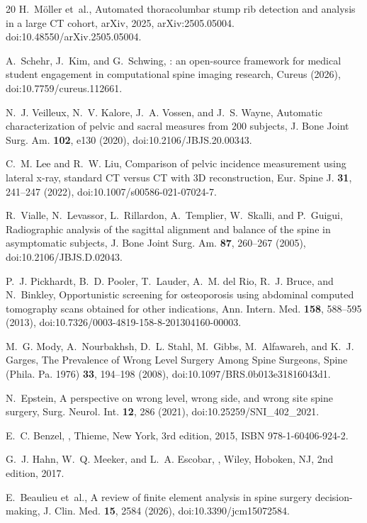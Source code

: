 \documentclass[aapm,mph,amsmath,amssymb,preprint,linenumbers]{revtex4-2}
\newif\ifcaptionlist \captionlisttrue
\begin{document}
\begin{thebibliography}{20}
H.~M{\"o}ller et~al.,
\newblock Automated thoracolumbar stump rib detection and analysis in a large {CT} cohort,
\newblock arXiv, 2025,
\newblock arXiv:2505.05004. doi:10.48550/arXiv.2505.05004.

A.~Schehr, J.~Kim, and G.~Schwing,
: an open-source framework for medical student engagement in computational spine imaging research,
\newblock Cureus  (2026),
\newblock doi:10.7759/cureus.112661.

N.~J. Veilleux, N.~V. Kalore, J.~A. Vossen, and J.~S. Wayne,
\newblock Automatic characterization of pelvic and sacral measures from 200 subjects,
\newblock J. Bone Joint Surg. Am. {\bf 102}, e130 (2020),
\newblock doi:10.2106/JBJS.20.00343.

C.~M. Lee and R.~W. Liu,
\newblock Comparison of pelvic incidence measurement using lateral x-ray, standard {CT} versus {CT} with {3D} reconstruction,
\newblock Eur. Spine J. {\bf 31}, 241--247 (2022),
\newblock doi:10.1007/s00586-021-07024-7.

R.~Vialle, N.~Levassor, L.~Rillardon, A.~Templier, W.~Skalli, and P.~Guigui,
\newblock Radiographic analysis of the sagittal alignment and balance of the spine in asymptomatic subjects,
\newblock J. Bone Joint Surg. Am. {\bf 87}, 260--267 (2005),
\newblock doi:10.2106/JBJS.D.02043.

P.~J. Pickhardt, B.~D. Pooler, T.~Lauder, A.~M. del Rio, R.~J. Bruce, and N.~Binkley,
\newblock Opportunistic screening for osteoporosis using abdominal computed tomography scans obtained for other indications,
\newblock Ann. Intern. Med. {\bf 158}, 588--595 (2013),
\newblock doi:10.7326/0003-4819-158-8-201304160-00003.

M.~G. Mody, A.~Nourbakhsh, D.~L. Stahl, M.~Gibbs, M.~Alfawareh, and K.~J. Garges,
\newblock The Prevalence of Wrong Level Surgery Among Spine Surgeons,
\newblock Spine (Phila. Pa. 1976) {\bf 33}, 194--198 (2008),
\newblock doi:10.1097/BRS.0b013e31816043d1.

N.~Epstein,
\newblock A perspective on wrong level, wrong side, and wrong site spine surgery,
\newblock Surg. Neurol. Int. {\bf 12}, 286 (2021),
\newblock doi:10.25259/SNI\_402\_2021.

E.~C. Benzel,
,
\newblock Thieme, New York, 3rd edition, 2015,
\newblock ISBN 978-1-60406-924-2.

G.~J. Hahn, W.~Q. Meeker, and L.~A. Escobar,
,
\newblock Wiley, Hoboken, NJ, 2nd edition, 2017.

E.~Beaulieu et~al.,
\newblock A review of finite element analysis in spine surgery decision-making,
\newblock J. Clin. Med. {\bf 15}, 2584 (2026),
\newblock doi:10.3390/jcm15072584.

\end{thebibliography}


\ifcaptionlist\fi
\end{document}

